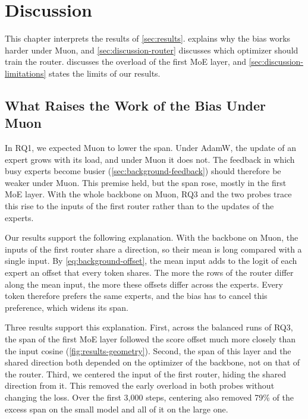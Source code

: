 \chapter{Discussion}
\label{sec:discussion}

This chapter interprets the results of \cref{sec:results}.  explains why the bias works harder under Muon, and \cref{sec:discussion-router} discusses which optimizer should train the router.  discusses the overload of the first MoE layer, and \cref{sec:discussion-limitations} states the limits of our results.

\section{What Raises the Work of the Bias Under Muon}
\label{sec:discussion-mechanism}
In RQ1, we expected Muon to lower the span. Under AdamW, the update of an expert grows with its load, and under Muon it does not. The feedback in which busy experts become busier (\cref{sec:background-feedback}) should therefore be weaker under Muon. This premise held, but the span rose, mostly in the first MoE layer. With the whole backbone on Muon, RQ3 and the two probes trace this rise to the inputs of the first router rather than to the updates of the experts.

Our results support the following explanation. With the backbone on Muon, the inputs of the first router share a direction, so their mean is long compared with a single input. By \cref{eq:background-offset}, the mean input adds to the logit of each expert an offset that every token shares. The more the rows of the router differ along the mean input, the more these offsets differ across the experts. Every token therefore prefers the same experts, and the bias has to cancel this preference, which widens its span.

Three results support this explanation. First, across the balanced runs of RQ3, the span of the first MoE layer followed the score offset much more closely than the input cosine (\cref{fig:results-geometry}). Second, the span of this layer and the shared direction both depended on the optimizer of the backbone, not on that of the router. Third, we centered the input of the first router, hiding the shared direction from it. This removed the early overload in both probes without changing the loss. Over the first 3,000 steps, centering also removed 79\% of the excess span on the small model and all of it on the large one.

